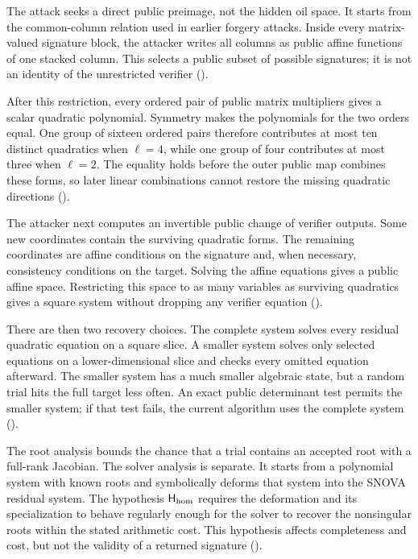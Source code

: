 \documentclass[11pt]{article}
\newcommand{\SNOVA}{\textsf{SNOVA}}
\begin{document}
The attack seeks a direct public preimage, not the hidden oil space.  It starts
from the common-column relation used in earlier forgery attacks.  Inside every
matrix-valued signature block, the attacker writes all columns as public
affine functions of one stacked column.  This selects a public subset of
possible signatures; it is not an identity of the unrestricted verifier
().

After this restriction, every ordered pair of public matrix multipliers gives
a scalar quadratic polynomial.  Symmetry makes the polynomials for the two
orders equal.  One group of sixteen ordered pairs therefore contributes at
most ten distinct quadratics when $\ell=4$, while one group of four
contributes at most three when $\ell=2$.  The equality holds before the outer
public map combines these forms, so later linear combinations cannot restore
the missing quadratic directions ().

The attacker next computes an invertible public change of verifier outputs.
Some new coordinates contain the surviving quadratic forms.  The remaining
coordinates are affine conditions on the signature and, when necessary,
consistency conditions on the target.  Solving the affine equations gives a
public affine space.  Restricting this space to as many variables as surviving
quadratics gives a square system without dropping any verifier equation
().

There are then two recovery choices.  The complete system solves every
residual quadratic equation on a square slice.  A smaller system solves only
selected equations on a lower-dimensional slice and checks every omitted
equation afterward.  The smaller system has a much smaller algebraic state,
but a random trial hits the full target less often.  An exact public
determinant test permits the smaller system; if that test fails, the current
algorithm uses the complete system ().

The root analysis bounds the chance that a trial contains an accepted root
with a full-rank Jacobian.  The solver analysis is separate.  It starts from a
polynomial system with known roots and symbolically deforms that system into
the \SNOVA{} residual system.  The hypothesis $\mathsf H_{\rm hom}$ requires
the deformation and its specialization to behave regularly enough for the
solver to recover the nonsingular roots within the stated arithmetic cost.
This hypothesis affects completeness and cost, but not the validity of a
returned signature ().
\end{document}
